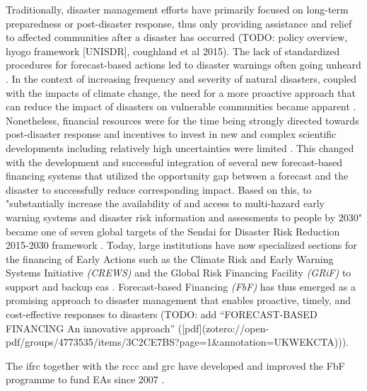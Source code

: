 Traditionally, disaster management efforts have primarily focused on long-term preparedness or post-disaster response, thus only providing assistance and relief to affected communities after a disaster has occurred (TODO: policy overview, hyogo framework [UNISDR], coughland et al 2015). The lack of standardized procedures for forecast-based actions led to disaster warnings often going unheard \autocite{kolenImpactsStormXynthia2013}. In the context of increasing frequency and severity of natural disasters, coupled with the impacts of climate change, the need for a more proactive approach that can reduce the impact of disasters on vulnerable communities became apparent \autocite{coughlandeperezForecastbasedFinancingApproach2015,trisosAfrica2022}. Nonetheless, financial resources were for the time being strongly directed towards post-disaster response and incentives to invest in new and complex scientific developments including relatively high uncertainties were limited \autocite{coughlandeperezActionbasedFloodForecasting2016}. This changed with the development and successful integration of several new forecast-based financing systems that utilized the opportunity gap between a forecast and the disaster to successfully reduce corresponding impact. Based on this, to "substantially increase the availability of and access to multi-hazard early warning systems and disaster risk information and assessments to people by 2030" became one of seven global targets of the Sendai for Disaster Risk Reduction 2015-2030 framework \autocites{coughlandeperezActionbasedFloodForecasting2016}[12]{undrrSendaiFrameworkDisaster}. Today, large institutions have now specialized sections for the financing of Early Actions such as the Climate Risk and Early Warning Systems Initiative \textit{(CREWS)} and the Global Risk Financing Facility \textit{(GRiF)} to support and backup \acfp{ea} \autocite{crewsClimateRiskEarly,GlobalRiskFinancing}. Forecast-based Financing \textit{(FbF)} has thus emerged as a promising approach to disaster management that enables proactive, timely, and cost-effective responses to disasters \autocite{coughlandeperezForecastbasedFinancingApproach2015} (TODO: add “FORECAST-BASED FINANCING An innovative approach” ([pdf](zotero://open-pdf/groups/4773535/items/3C2CE7BS?page=1&annotation=UKWEKCTA))).

The \acrfull*{ifrc} together with the \acrfull*{rccc} and \acrfull*{grc} have developed and improved the FbF programme to fund EAs since 2007 \autocite{ifrcForecastbasedFinancingNew2019}. 

